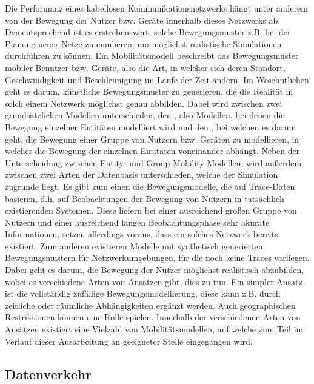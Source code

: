 \documentclass[12pt, a4paper]{article}
\begin{document}
Die Performanz eines kabellosen Kommunikationsnetzwerks hängt unter anderem von der Bewegung 
der Nutzer bzw. Geräte innerhalb dieses Netzwerks ab. Dementsprechend ist es erstrebenswert,
solche Bewegungsmuster z.B. bei der Planung neuer Netze zu emulieren, um möglichst realistische Simulationen
durchführen zu können. Ein Mobilitätsmodell beschreibt das Bewegungsmuster mobiler Benutzer bzw. Geräte,
also die Art, in welcher sich deren Standort, Geschwindigkeit und Beschleunigung im Laufe der Zeit ändern. \cite{Camp2002}
Im Wesehntlichen geht es darum, künstliche Bewegungsmuster zu generieren, die die Realität in solch einem Netzwerk
möglichst genau abbilden.
\newline\newline
Dabei wird zwischen zwei grundsätzlichen Modellen unterschieden, den ,
also Modellen, bei denen die Bewegung einzelner Entitäten modelliert wird und den ,
bei welchen es darum geht, die Bewegung einer Gruppe von Nutzern bzw. Geräten zu modellieren,
in welcher die Bewegung der einzelnen Entitäten voneinander abhängt.
\newline\newline
Neben der Unterscheidung zwischen Entity- und Group-Mobility-Modellen, wird außerdem zwischen zwei Arten der Datenbasis unterschieden,
welche der Simulation zugrunde liegt. Es gibt zum einen die Bewegungsmodelle, die auf Trace-Daten basieren, d.h. auf Beobachtungen
der Bewegung von Nutzern in tatsächlich existierenden Systemen. Diese liefern bei einer ausreichend großen Gruppe von Nutzern
und einer ausreichend langen Beobachtungsphase sehr akurate Informationen, setzen allerdings voraus, dass ein solches Netzwerk
bereits existiert. \cite{Camp2002} Zum anderen existieren Modelle mit synthetisch generierten Bewegungsmustern für Netzwerkumgebungen, 
für die noch keine Traces vorliegen. Dabei geht es darum, die Bewegung der Nutzer möglichst realistisch abzubilden,
wobei es verschiedene Arten von Ansätzen gibt, dies zu tun. Ein simpler Ansatz ist die vollständig zufällige Bewegungsmodellierung,
diese kann z.B. durch zeitliche oder räumliche Abhängigkeiten ergänzt werden. Auch geographischen Restriktionen können eine
Rolle spielen. Innerhalb der verschiedenen Arten von Ansätzen existiert eine Vielzahl von Mobilitätsmodellen, 
auf welche zum Teil im Verlauf dieser Ausarbeitung an geeigneter Stelle eingegangen wird.

\pagebreak

\subsection{Datenverkehr}
\label{sec:traffic}
\end{document}
